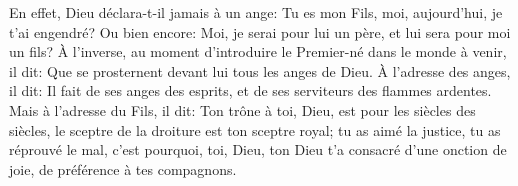 En effet, Dieu déclara-t-il jamais à un ange:
	Tu es mon Fils, moi, aujourd’hui, je t’ai engendré?
	Ou bien encore:
		Moi, je serai pour lui un père, et lui sera pour moi un fils?
À l’inverse, au moment d’introduire le Premier-né dans le monde à venir, il dit:
	Que se prosternent devant lui tous les anges de Dieu.
À l’adresse des anges, il dit:
	Il fait de ses anges des esprits, et de ses serviteurs des flammes ardentes.
Mais à l’adresse du Fils, il dit:
	Ton trône à toi, Dieu, est pour les siècles des siècles,
	le sceptre de la droiture est ton sceptre royal;
	tu as aimé la justice, tu as réprouvé le mal,
	c’est pourquoi, toi, Dieu, ton Dieu t’a consacré d’une onction de joie,
		de préférence à tes compagnons.

